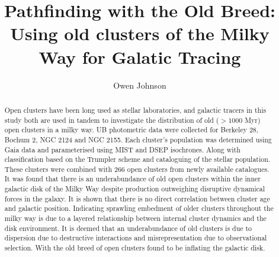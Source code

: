 \documentclass[twocolumn]{aastex631}
\newcommand\aastex{AAS\TeX}
\begin{document}
\title{Pathfinding with the Old Breed: Using old clusters of the Milky Way for Galatic Tracing}
\author[0000-0002-5927-0481]{Owen Johnson}



\begin{abstract}

    Open clusters have been long used as stellar laboratories, and galactic tracers in this study both are used in tandem to investigate the distribution of old ($> 1000$ Myr) open clusters in a milky way. UB photometric data were collected for Berkeley 28, Bochum 2, NGC 2124 and NGC 2155. Each cluster's population was determined using Gaia data and parameterised using MIST and DSEP isochrones. Along with classification based on the Trumpler scheme and cataloguing of the stellar population. These clusters were combined with 266 open clusters from newly available catalogues. It was found that there is an underabundance of old open clusters within the inner galactic disk of the Milky Way despite production outweighing disruptive dynamical forces in the galaxy. It is shown that there is no direct correlation between cluster age and galactic position. Indicating sprawling embedment of older clusters throughout the milky way is due to a layered relationship between internal cluster dynamics and the disk environment. It is deemed that an underabundance of old clusters is due to dispersion due to destructive interactions and misrepresentation due to observational selection. With the old breed of open clusters found to be inflating the galactic disk. 


\end{abstract}
\end{document}
